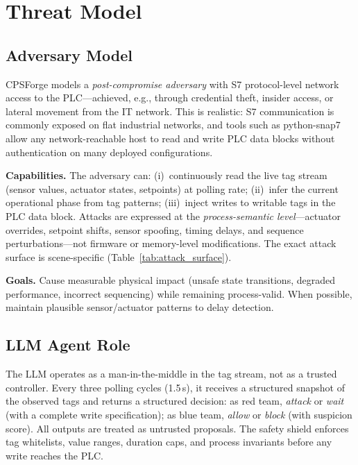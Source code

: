 \section{Threat Model}
\label{sec:threat}

\subsection{Adversary Model}

CPSForge models a \emph{post-compromise adversary} with S7 protocol-level network access to the PLC---achieved, e.g., through credential theft, insider access, or lateral movement from the IT network. This is realistic: S7 communication is commonly exposed on flat industrial networks, and tools such as python-snap7 allow any network-reachable host to read and write PLC data blocks without authentication on many deployed configurations.

\textbf{Capabilities.} The adversary can: (i)~continuously read the live tag stream (sensor values, actuator states, setpoints) at polling rate; (ii)~infer the current operational phase from tag patterns; (iii)~inject writes to writable tags in the PLC data block. Attacks are expressed at the \emph{process-semantic level}---actuator overrides, setpoint shifts, sensor spoofing, timing delays, and sequence perturbations---not firmware or memory-level modifications. The exact attack surface is scene-specific (Table~\ref{tab:attack_surface}).

\textbf{Goals.} Cause measurable physical impact (unsafe state transitions, degraded performance, incorrect sequencing) while remaining process-valid. When possible, maintain plausible sensor/actuator patterns to delay detection.

\subsection{LLM Agent Role}

The LLM operates as a man-in-the-middle in the tag stream, not as a trusted controller. Every three polling cycles (1.5\,s), it receives a structured snapshot of the observed tags and returns a structured decision: as red team, \emph{attack} or \emph{wait} (with a complete write specification); as blue team, \emph{allow} or \emph{block} (with suspicion score). All outputs are treated as untrusted proposals. The safety shield enforces tag whitelists, value ranges, duration caps, and process invariants before any write reaches the PLC.

